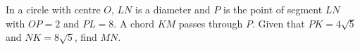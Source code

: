 In a circle with centre $O$, $LN$ is a diameter and $P$ is the point of segment $LN$ with $OP=2$ and $PL=8$. A chord $KM$ passes through $P$. Given that $PK=4\sqrt5$ and $NK=8\sqrt5$, find $MN$.

